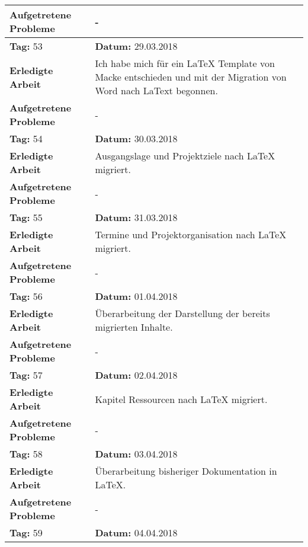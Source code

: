 \begin{longtable}{|p{5cm}|p{5cm}p{6cm}|}
\textbf{Aufgetretene Probleme} & \multicolumn{2}{p{11cm}|}{-} \\ \hline
\rowcolor{heading}\textbf{Tag:} 53 & \textbf{Datum:} 29.03.2018 & \\ \hline
\textbf{Erledigte Arbeit} & \multicolumn{2}{p{11cm}|}{Ich habe mich für ein LaTeX Template von Macke entschieden und mit der Migration von Word nach LaText begonnen.} \\ \hline
\textbf{Aufgetretene Probleme} & \multicolumn{2}{p{11cm}|}{-} \\ \hline
\rowcolor{heading}\textbf{Tag:} 54 & \textbf{Datum:} 30.03.2018 & \\ \hline
\textbf{Erledigte Arbeit } & \multicolumn{2}{p{11cm}|}{Ausgangslage und Projektziele nach LaTeX migriert.} \\ \hline
\textbf{Aufgetretene Probleme\newline } & \multicolumn{2}{p{11cm}|}{-} \\ \hline
\rowcolor{heading}\textbf{Tag:} 55 & \textbf{Datum:} 31.03.2018 & \\ \hline
\textbf{Erledigte Arbeit} & \multicolumn{2}{p{11cm}|}{Termine und Projektorganisation nach LaTeX migriert.} \\ \hline
\textbf{Aufgetretene Probleme } & \multicolumn{2}{p{11cm}|}{-} \\ \hline
\rowcolor{heading}\textbf{Tag:} 56 & \textbf{Datum:} 01.04.2018 & \\ \hline
\textbf{Erledigte Arbeit} & \multicolumn{2}{p{11cm}|}{Überarbeitung der Darstellung der bereits migrierten Inhalte.} \\ \hline
\textbf{Aufgetretene Probleme} & \multicolumn{2}{p{11cm}|}{-} \\ \hline
\rowcolor{heading}\textbf{Tag:} 57 & \textbf{Datum:} 02.04.2018 & \\ \hline
\textbf{Erledigte Arbeit} & \multicolumn{2}{p{11cm}|}{Kapitel Ressourcen nach LaTeX migriert.} \\ \hline
\textbf{Aufgetretene Probleme} & \multicolumn{2}{p{11cm}|}{-} \\ \hline
\rowcolor{heading}\textbf{Tag:} 58 & \textbf{Datum:} 03.04.2018 & \\ \hline
\textbf{Erledigte Arbeit} & \multicolumn{2}{p{11cm}|}{Überarbeitung bisheriger Dokumentation in LaTeX.} \\ \hline
\textbf{Aufgetretene Probleme} & \multicolumn{2}{p{11cm}|}{-} \\ \hline
\rowcolor{heading}\textbf{Tag:} 59 & \textbf{Datum:} 04.04.2018 & \\ \hline

\end{longtable}
